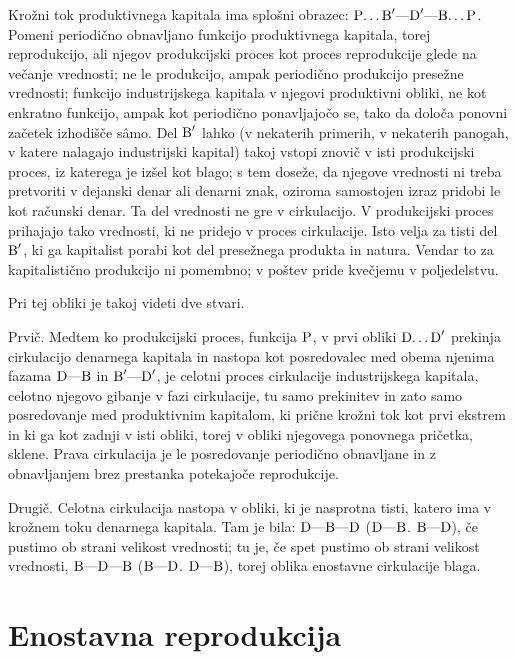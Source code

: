 \documentclass[kapital_02.tex]{subfiles}
\begin{document}
Krožni tok produktivnega kapitala ima splošni obrazec: \( \textrm{P}\textrm{\dots}\textrm{B}'\textrm{---}\textrm{D}'\textrm{---}\textrm{B}\textrm{\dots}\textrm{P} \). Pomeni periodično obnavljano funkcijo produktivnega kapitala, torej reprodukcijo, ali njegov produkcijski proces kot proces reprodukcije glede na večanje vrednosti; ne le produkcijo, ampak periodično produkcijo presežne vrednosti; funkcijo industrijskega kapitala v njegovi produktivni obliki, ne kot enkratno funkcijo, ampak kot periodično ponavljajočo se, tako da določa ponovni začetek izhodišče s\^amo. Del \( \textrm{B}' \) lahko (v nekaterih primerih, v nekaterih panogah, v katere nalagajo industrijski kapital) takoj vstopi znovič v isti produkcijski proces, iz katerega je izšel kot blago; s tem doseže, da njegove vrednosti ni treba pretvoriti v dejanski denar ali denarni znak, oziroma samostojen izraz pridobi le kot računski denar. Ta del vrednosti ne gre v cirkulacijo. V produkcijski proces prihajajo tako vrednosti, ki ne pridejo v proces cirkulacije. Isto velja za tisti del \( \textrm{B}' \), ki ga kapitalist porabi kot del presežnega produkta in natura. Vendar to za kapitalistično produkcijo ni pomembno; v poštev pride kvečjemu v poljedelstvu.

Pri tej obliki je takoj videti dve stvari.

Prvič. Medtem ko produkcijski proces, funkcija \( \textrm{P} \), v prvi obliki \( \textrm{D}\textrm{\dots}\textrm{D}' \) prekinja cirkulacijo denarnega kapitala in nastopa kot posredovalec med obema njenima fazama \( \textrm{D}\textrm{---}\textrm{B} \) in \( \textrm{B}'\textrm{---}\textrm{D}' \), je celotni proces cirkulacije industrijskega kapitala, celotno njegovo gibanje v fazi cirkulacije, tu samo prekinitev in zato samo posredovanje med produktivnim kapitalom, ki prične krožni tok kot prvi ekstrem in ki ga kot zadnji v isti obliki, torej v obliki njegovega ponovnega pričetka, sklene. Prava cirkulacija je le posredovanje periodično obnavljane in z obnavljanjem brez prestanka potekajoče reprodukcije.

Drugič. Celotna cirkulacija nastopa v obliki, ki je nasprotna tisti, katero ima v krožnem toku denarnega kapitala. Tam je bila: \( \textrm{D}\textrm{---}\textrm{B}\textrm{---}\textrm{D} \) (\( \textrm{D}\textrm{---}\textrm{B} \). \( \textrm{B}\textrm{---}\textrm{D} \)), če pustimo ob strani velikost vrednosti; tu je, če spet pustimo ob strani velikost vrednosti, \( \textrm{B}\textrm{---}\textrm{D}\textrm{---}\textrm{B} \) (\( \textrm{B}\textrm{---}\textrm{D} \). \( \textrm{D}\textrm{---}\textrm{B} \)), torej oblika enostavne cirkulacije blaga.

\section{Enostavna reprodukcija}
\end{document}
